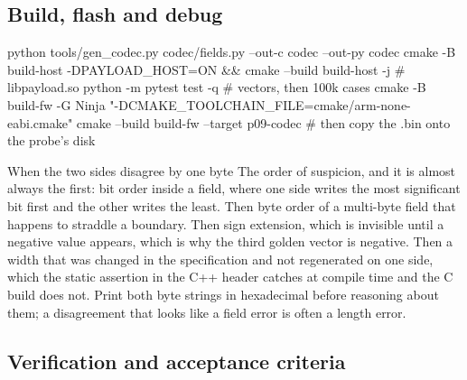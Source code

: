 \subsection*{Build, flash and debug}


\begin{shellcode}
python tools/gen_codec.py codec/fields.py --out-c codec --out-py codec
cmake -B build-host -DPAYLOAD_HOST=ON && cmake --build build-host -j   # libpayload.so
python -m pytest test -q                                     # vectors, then 100k cases
cmake -B build-fw -G Ninja "-DCMAKE_TOOLCHAIN_FILE=cmake/arm-none-eabi.cmake"
cmake --build build-fw --target p09-codec     # then copy the .bin onto the probe's disk
\end{shellcode}

\begin{note}{When the two sides disagree by one byte}
The order of suspicion, and it is almost always the first: bit order inside a
field, where one side writes the most significant bit first and the other writes
the least. Then byte order of a multi-byte field that happens to straddle a
boundary. Then sign extension, which is invisible until a negative value
appears, which is why the third golden vector is negative. Then a width that was
changed in the specification and not regenerated on one side, which the static
assertion in the C++ header catches at compile time and the C build does not.
Print both byte strings in hexadecimal before reasoning about them; a
disagreement that looks like a field error is often a length error.
\end{note}

\subsection*{Verification and acceptance criteria}

